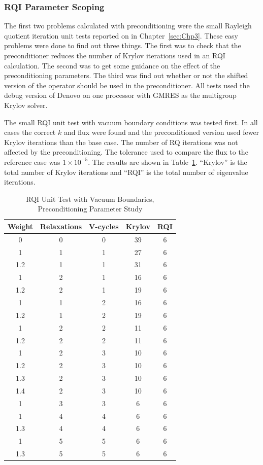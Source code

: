 \subsubsection{RQI Parameter Scoping}
The first two problems calculated with preconditioning were the small Rayleigh quotient iteration unit tests reported on in Chapter~\ref{sec:Chp3}. These easy problems were done to find out three things. The first was to check that the preconditioner reduces the number of Krylov iterations used in an RQI calculation. The second was to get some guidance on the effect of the preconditioning parameters. The third was find out whether or not the shifted version of the operator should be used in the preconditioner. All tests used the debug version of Denovo on one processor with GMRES as the multigroup Krylov solver.

The small RQI unit test with vacuum boundary conditions was tested first. In all cases the correct $k$ and flux were found and the preconditioned version used fewer Krylov iterations than the base case. The number of RQ iterations was not affected by the preconditioning. The tolerance used to compare the flux to the reference case was $1 \times 10^{-5}$. The results are shown in Table~\ref{table:RQIUnitTestVac}. ``Krylov'' is the total number of Krylov iterations and ``RQI'' is the total number of eigenvalue iterations.
%
\begin{table}[!h]
\caption{RQI Unit Test with Vacuum Boundaries, Preconditioning Parameter Study}
\begin{center}
\begin{tabular}{| c | c | c | c | c |}
\hline
Weight & Relaxations & V-cycles & Krylov & RQI \\[0.5ex]
\hline
0    & 0 & 0 & 39 & 6 \\
1    & 1 & 1 & 27 & 6 \\
1.2 & 1 & 1 & 31 & 6 \\
1    & 2 & 1 & 16 & 6 \\
1.2 & 2 & 1 & 19 & 6 \\
1    & 1 & 2 & 16 & 6 \\
1.2 & 1 & 2 & 19 & 6 \\
1    & 2 & 2 & 11 & 6 \\
1.2 & 2 & 2 & 11 & 6 \\
\hline
1    & 2 & 3 & 10 & 6 \\
1.2 & 2 & 3 & 10 & 6 \\
1.3 & 2 & 3 & 10 & 6 \\
1.4 & 2 & 3 & 10 & 6 \\
\hline
1    & 3 & 3 & 6   & 6 \\
1    & 4 & 4 & 6   & 6 \\
1.3 & 4 & 4 & 6   & 6 \\
1    & 5 & 5 & 6   & 6 \\
1.3 & 5 & 5 & 6   & 6 \\
\hline 
\end{tabular}
\end{center}
\label{table:RQIUnitTestVac}
\end{table}

